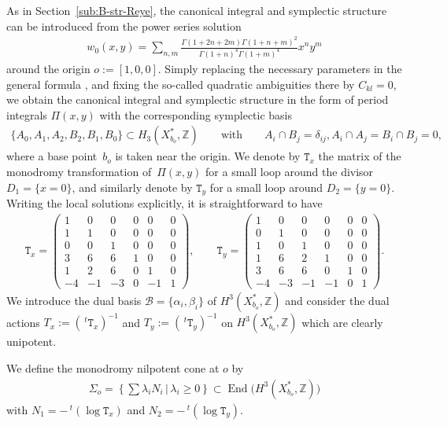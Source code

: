 \documentclass[10pt,a4paper]{amsart}
\numberwithin{equation}{section}
\begin{document}
As in Section~\ref{sub:B-str-Reye}, the canonical integral and symplectic structure can be introduced from the power series solution
\begin{gather*}
w_{0}(x,y)=\sum_{n,m}\frac{\Gamma(1+2n+2m)\Gamma(1+n+m)^{2}}{\Gamma(1+n)^{4}\Gamma(1+m)^{4}}x^{n}y^{m}
\end{gather*}
around the origin $o:=[1,0,0]$. Simply replacing the necessary parameters in the general formula \cite[Section~6.3.1]{HTcmp}, and fixing the so-called quadratic ambiguities there by $C_{kl}=0$, we obtain the canonical integral and symplectic structure in the form of period integrals $\Pi(x,y)$ with the corresponding symplectic basis
\begin{gather*}
\{ A_{0},A_{1},A_{2},B_{2},B_{1},B_{0}\} \subset H_{3}(X_{b_{o}}^{*},\mathbb{Z})\qquad \text{with}\qquad A_{i}\cap B_{j}=\delta_{ij},A_{i}\cap A_{j}=B_{i}\cap B_{j}=0,
\end{gather*}
where a base point~$b_{o}$ is taken near the origin. We denote by $\mathtt{T}_{x}$ the matrix of the monodromy transformation of~$\Pi(x,y)$ for a small loop around the divisor $D_{1}= \{ x=0 \} $, and similarly denote by $\mathtt{T}_{y}$ for a small loop around $D_{2}= \{ y=0 \} $. Writing the local solutions explicitly, it is straightforward to have
\begin{gather*}
\mathtt{T}_{x}=\left(\begin{smallmatrix}1 & 0 & 0 & 0 & 0 & 0\\
1 & 1 & 0 & 0 & 0 & 0\\
0 & 0 & 1 & 0 & 0 & 0\\
3 & 6 & 6 & 1 & 0 & 0\\
1 & 2 & 6 & 0 & 1 & 0\\
-4 & -1 & -3 & 0 & -1 & 1
\end{smallmatrix}\right),\qquad \mathtt{T}_{y}=\left(\begin{smallmatrix}1 & 0 & 0 & 0 & 0 & 0\\
0 & 1 & 0 & 0 & 0 & 0\\
1 & 0 & 1 & 0 & 0 & 0\\
1 & 6 & 2 & 1 & 0 & 0\\
3 & 6 & 6 & 0 & 1 & 0\\
-4 & -3 & -1 & -1 & 0 & 1
\end{smallmatrix}\right).
\end{gather*}
We introduce the dual basis $\mathcal{B}= \{ \alpha_{i},\beta_{i} \} $ of $H^{3}(X_{b_{o}}^{*},\mathbb{Z})$ and consider the dual actions $T_{x}:=(\,^{t}\mathtt{T}_{x})^{-1}$ and $T_{y}:=(\,^{t}\mathtt{T}_{y})^{-1}$ on $H^{3}(X_{b_{o}}^{*},\mathbb{Z})$ which are clearly unipotent.
\begin{Definition}
We define the monodromy nilpotent cone at $o$ by
\begin{gather*}
\Sigma_{o}=\left\{ \sum\lambda_{i}N_{i}\,|\,\lambda_{i}\geq0\right\} \subset\operatorname{End}\big(H^{3}(X_{b_{o}}^{*},\mathbb{Z})\big)
\end{gather*}
with $N_{1}=-\,^{t}(\log\mathtt{T}_{x})$ and $N_{2}=-\,^{t}(\log\mathtt{T}_{y})$.
\end{Definition}
\end{document}
